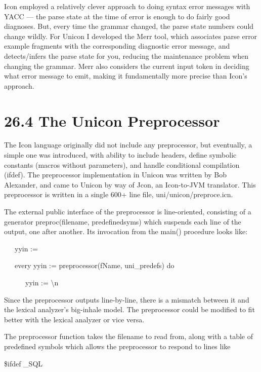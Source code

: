 Icon employed a relatively clever approach to doing syntax error
messages with YACC --- the parse state at the time of error is enough
to do fairly good diagnoses. But, every time the grammar changed, the
parse state numbers could change wildly. For Unicon I developed the
Merr tool, which associates parse error example fragments with the
corresponding diagnostic error message, and detects/infers the parse
state for you, reducing the maintenance problem when changing the
grammar. Merr also considers the current input token in deciding what
error message to emit, making it fundamentally more precise than
Icon's approach.

\section[26.4 The Unicon Preprocessor]{26.4 The Unicon Preprocessor}

The Icon language originally did not include any preprocessor, but
eventually, a simple one was introduced, with ability to include
headers, define symbolic constants (macros without parameters), and
handle conditional compilation (ifdef).  The preprocessor
implementation in Unicon was written by Bob Alexander, and came to
Unicon by way of Jcon, an Icon-to-JVM translator. This preprocessor is
written in a single 600+ line file, uni/unicon/preproce.icn.

The external public interface of the preprocessor is line-oriented,
consisting of a generator preproc(filename, predefinedsyms) which
suspends each line of the output, one after another. Its invocation
from the main() procedure looks like:

{\ttfamily\mdseries
\ \ \ yyin := {\textquotedbl}{\textquotedbl}}

{\ttfamily\mdseries
\ \ \ every yyin {\textbar}{\textbar}:= preprocessor(fName, uni\_predefs) do}

{\ttfamily\mdseries
\ \ \ \ \ \ yyin {\textbar}{\textbar}:= {\textquotedbl}{\textbackslash}n{\textquotedbl}}


Since the preprocessor outputs line-by-line, there is a mismatch
between it and the lexical analyzer's big-inhale model.  The
preprocessor could be modified to fit better with the lexical analyzer
or vice versa.

The preprocessor function takes the filename to read from, along with
a table of predefined symbols which allows the preprocessor to respond
to lines like

{\ttfamily\mdseries
\$ifdef \_SQL}

